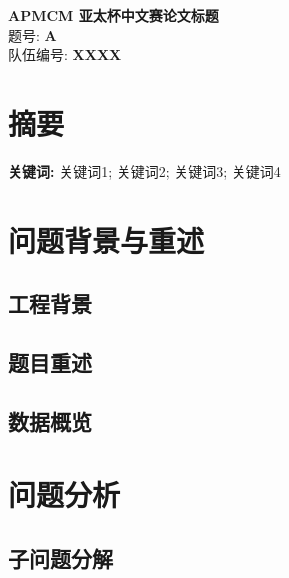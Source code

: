 \documentclass[12pt,a4paper]{ctexart}
\begin{document}
\begin{titlepage}
\begin{center}
\vspace*{2cm}
{\Huge \textbf{APMCM 亚太杯中文赛论文标题}}\\[2cm]
{\Large 题号: \textbf{A}}\\[1cm]
{\Large 队伍编号: \textbf{XXXX}}\\[3cm]
\end{center}
\end{titlepage}

\section*{摘要}


\textbf{关键词:} 关键词1; 关键词2; 关键词3; 关键词4

\newpage
\tableofcontents
\newpage


\section{问题背景与重述}

\subsection{工程背景}

\subsection{题目重述}

\subsection{数据概览}

\section{问题分析}

\subsection{子问题分解}
\end{document}
